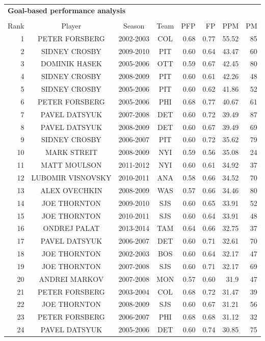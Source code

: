 \begin{table}[p]
	\centering\small
	\begin{tabular}{r c c c|r r r r }
		\multicolumn{8}{l}{\bf Goal-based performance analysis} \\ \\
		Rank & Player & Season  & Team & PFP & FP & PPM & PM \\ \hline
		\rule{0pt}{4ex} 
		1&PETER FORSBERG&2002-2003&COL&0.68&0.77&55.52&85\\
		2&SIDNEY CROSBY&2009-2010&PIT&0.60&0.64&43.47&60\\
		3&DOMINIK HASEK&2005-2006&OTT&0.59&0.67&42.45&80\\
		4&SIDNEY CROSBY&2008-2009&PIT&0.60&0.61&42.26&48\\
		5&SIDNEY CROSBY&2005-2006&PIT&0.60&0.62&41.86&52\\
		6&PETER FORSBERG&2005-2006&PHI&0.68&0.77&40.67&61\\
		7&PAVEL DATSYUK&2007-2008&DET&0.60&0.72&39.49&87\\
		8&PAVEL DATSYUK&2008-2009&DET&0.60&0.67&39.49&69\\
		9&SIDNEY CROSBY&2006-2007&PIT&0.60&0.72&35.62&79\\
		10&MARK STREIT&2008-2009&NYI&0.59&0.56&35.08&24\\
		11&MATT MOULSON&2011-2012&NYI&0.60&0.61&34.92&37\\
		12&LUBOMIR VISNOVSKY&2010-2011&ANA&0.58&0.66&34.52&70\\
		13&ALEX OVECHKIN&2008-2009&WAS&0.57&0.66&34.46&80\\
		14&JOE THORNTON&2009-2010&SJS&0.60&0.65&33.91&52\\
		15&JOE THORNTON&2010-2011&SJS&0.60&0.64&33.91&48\\
		16&ONDREJ PALAT&2013-2014&TAM&0.64&0.66&32.75&37\\
		17&PAVEL DATSYUK&2006-2007&DET&0.60&0.71&32.61&70\\
		18&JOE THORNTON&2002-2003&BOS&0.60&0.64&32.17&47\\
		19&JOE THORNTON&2007-2008&SJS&0.60&0.71&32.17&69\\
		20&ANDREI MARKOV&2007-2008&MON&0.57&0.60&31.9&47\\
		21&PETER FORSBERG&2003-2004&COL&0.68&0.72&31.47&39\\
		22&JOE THORNTON&2008-2009&SJS&0.60&0.67&31.21&56\\
		23&PETER FORSBERG&2006-2007&PHI&0.68&0.68&31.12&32\\
		24&PAVEL DATSYUK&2005-2006&DET&0.60&0.74&30.85&75\\

\end{tabular}
\end{table}
